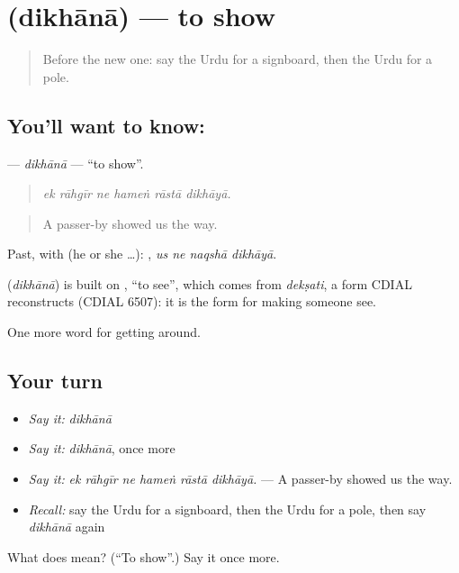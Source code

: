 \section[\texorpdfstring{\ur{دکھانا} (dikhānā)}{دکھانا (dikhānā)}]{ (dikhānā) — to show}

\label{lesson:UR-C410-dikhana}



\begin{quote}
Before the new one: say the Urdu for a signboard, then the Urdu for a pole.
\end{quote}

\subsection*{You'll want to know: }
\textbf{} — \emph{dikhānā} — \textquotedblleft{}to show\textquotedblright{}.

\begin{quote}
     
\end{quote}

\begin{quote}
\emph{ek rāhgīr ne hameṅ rāstā dikhāyā.}
\end{quote}

\begin{quote}
A passer-by showed us the way.
\end{quote}

Past, with  (he or she …):    , \emph{us ne naqshā dikhāyā}.

\begin{cousinweb}
\textbf{} (\emph{dikhānā}) is built on \textbf{}, \textquotedblleft{}to see\textquotedblright{}, which comes from \emph{dekṣati}, a form CDIAL reconstructs (CDIAL 6507): it is the form for making someone see.
\end{cousinweb}

\begin{grammarlens}[title={What you've built}]
One more word for getting around.
\end{grammarlens}

\subsection*{Your turn}
\begin{itemize}
\raggedright
  \item \emph{Say it:} \emph{dikhānā}
  \item \emph{Say it:} \emph{dikhānā}, once more
  \item \emph{Say it:} \emph{ek rāhgīr ne hameṅ rāstā dikhāyā.} — A passer-by showed us the way.
  \item \emph{Recall:} say the Urdu for a signboard, then the Urdu for a pole, then say \emph{dikhānā} again
\end{itemize}

\begin{tcolorbox}[breakable,colback=teal!4,colframe=teal!35!black,title={Before you move on}]
What does  mean? (\textquotedblleft{}To show\textquotedblright{}.) Say it once more.
\end{tcolorbox}
